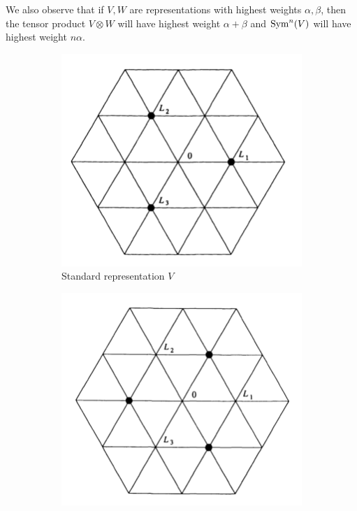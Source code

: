 \documentclass{report}
\begin{document}
We also observe that if $V, W$ are representations with highest weights $\alpha, \beta$, then the tensor product $V \otimes W$ will have highest weight $\alpha + \beta$ and $\operatorname{Sym}^n(V)$ will have highest weight $n \alpha$. 
\begin{figure}[h]
    \centering
    \begin{subfigure}[b]{0.23\textwidth}
        \centering
        \includegraphics[width=\textwidth]{sl_3_C_weights_standard.png}
        \caption{Standard representation $V$}
        \label{fig:sl_3_C_weights_standard}
    \end{subfigure}
    \hfill
    \begin{subfigure}[b]{0.23\textwidth}
        \centering
        \includegraphics[width=\textwidth]{sl_3_C_weights_dual.png}

\end{subfigure}
\end{figure}
\end{document}
